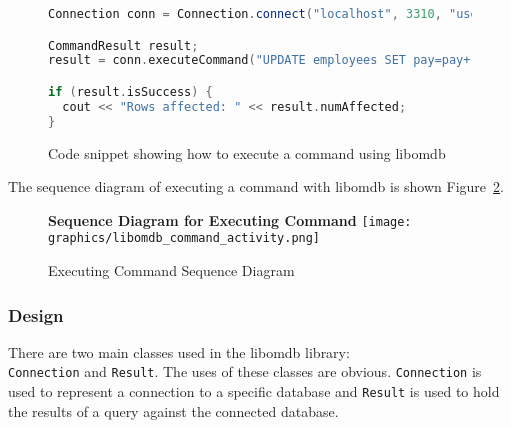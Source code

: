 \documentclass[letterpaper, 11pt]{article}
\newcommand{\inlinecode}[1]{\colorbox{codegrey}{\lstinline[language=C++]{#1}}}
\begin{document}
  \begin{figure}[H]
  \begin{lstlisting}[language=C++]
Connection conn = Connection.connect("localhost", 3310, "users");

CommandResult result;
result = conn.executeCommand("UPDATE employees SET pay=pay+1;");

if (result.isSuccess) {
  cout << "Rows affected: " << result.numAffected;
}
  \end{lstlisting}
  \label{code:lib_cmd_exec}
  \caption{Code snippet showing how to execute a command using libomdb}
  \end{figure}
 
  \par\vspace{\baselineskip}
  The sequence diagram of executing a command with libomdb is shown Figure~\ref{fig:libomdb_command_sequence}.
  
  \begin{figure}[H]
    \centering
    \textbf{Sequence Diagram for Executing Command}
    \texttt{[image: graphics/libomdb\_command\_activity.png]}
    \caption{Executing Command Sequence Diagram}
    \label{fig:libomdb_command_sequence}
  \end{figure}

  \par\vspace{\baselineskip}

  \subsubsection{Design}
  There are two main classes used in the libomdb library:  \\
  \inlinecode{Connection} and \inlinecode{Result}. The uses of these classes
  are obvious. \inlinecode{Connection} is used to represent a connection to
  a specific database and \inlinecode{Result} is used to hold the results of a
  query against the connected database.
\end{document}
